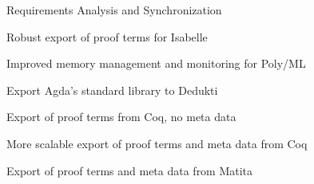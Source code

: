 \begin{workpackage}
\begin{wpdelivs}
  \begin{wpdeliv}[due=3,miles=startup,id=requirements,dissem=PU,nature=DEM,lead=Inr]
      {Requirements Analysis and Synchronization}
  \end{wpdeliv}
  \begin{wpdeliv}[due=12,miles=logipedia-v1,id=isabelle1,dissem=PU,nature=DEM,lead=Tum]
      {Robust export of proof terms for Isabelle}
  \end{wpdeliv}
  \begin{wpdeliv}[due=12,miles=logipedia-v1,id=isabelle1,dissem=PU,nature=DEM,lead=Tum]
      {Improved memory management and monitoring for Poly/ML}
  \end{wpdeliv}
  \begin{wpdeliv}[due=18,miles=agda-stdlib,id=agda,dissem=PU,nature=DEM,lead=Del]
      {Export Agda's standard library to Dedukti}
  \end{wpdeliv}
  \begin{wpdeliv}[due=8,miles=logipedia-v1,id=coq1,dissem=PU,nature=DEM,lead=Inr]
    {Export of proof terms from Coq, no meta data}
  \end{wpdeliv}
  \begin{wpdeliv}[due=24,miles=logipedia-v2,id=coq2,dissem=PU,nature=DEM,lead=Bol]
    {More scalable export of proof terms and meta data from Coq}
  \end{wpdeliv}
  \begin{wpdeliv}[due=12,miles=logipedia-v1,id=matita1,dissem=PU,nature=DEM,lead=Bol]
    {Export of proof terms and meta data from Matita}
  \end{wpdeliv}
\end{wpdelivs}
\end{workpackage}

